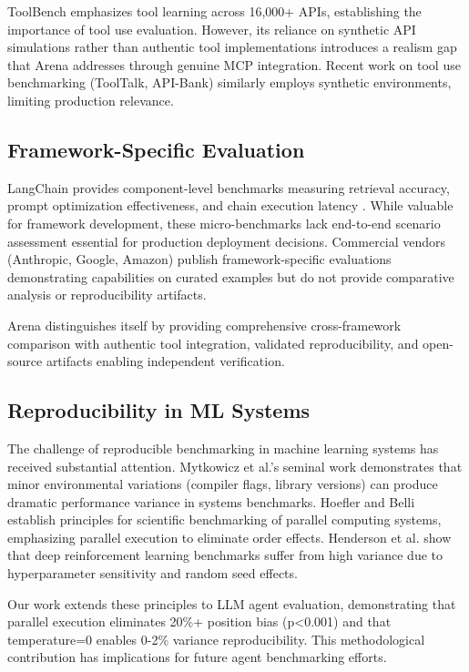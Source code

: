 \documentclass[sigconf,nonacm]{acmart}
\begin{document}
ToolBench \cite{qin2023toolllm} emphasizes tool learning across 16,000+ APIs, establishing the importance of tool use evaluation. However, its reliance on synthetic API simulations rather than authentic tool implementations introduces a realism gap that Arena addresses through genuine MCP integration. Recent work on tool use benchmarking (ToolTalk, API-Bank) similarly employs synthetic environments, limiting production relevance.

\subsection{Framework-Specific Evaluation}

LangChain provides component-level benchmarks measuring retrieval accuracy, prompt optimization effectiveness, and chain execution latency \cite{langchain2023}. While valuable for framework development, these micro-benchmarks lack end-to-end scenario assessment essential for production deployment decisions. Commercial vendors (Anthropic, Google, Amazon) publish framework-specific evaluations demonstrating capabilities on curated examples but do not provide comparative analysis or reproducibility artifacts.

Arena distinguishes itself by providing comprehensive cross-framework comparison with authentic tool integration, validated reproducibility, and open-source artifacts enabling independent verification.

\subsection{Reproducibility in ML Systems}

The challenge of reproducible benchmarking in machine learning systems has received substantial attention. Mytkowicz et al.'s seminal work \cite{mytkowicz2009producing} demonstrates that minor environmental variations (compiler flags, library versions) can produce dramatic performance variance in systems benchmarks. Hoefler and Belli \cite{hoefler2015scientific} establish principles for scientific benchmarking of parallel computing systems, emphasizing parallel execution to eliminate order effects. Henderson et al. \cite{henderson2018deep} show that deep reinforcement learning benchmarks suffer from high variance due to hyperparameter sensitivity and random seed effects.

Our work extends these principles to LLM agent evaluation, demonstrating that parallel execution eliminates 20\%+ position bias (p<0.001) and that temperature=0 enables 0-2\% variance reproducibility. This methodological contribution has implications for future agent benchmarking efforts.
\end{document}
